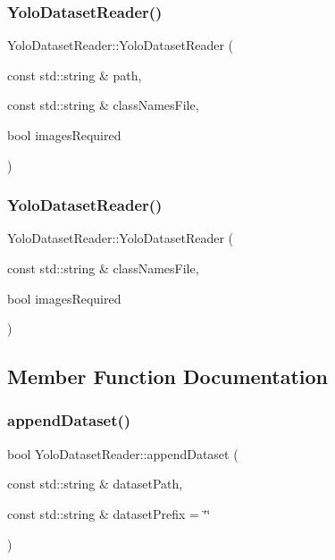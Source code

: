 \subsubsection{\texorpdfstring{Yolo\+Dataset\+Reader()}{YoloDatasetReader()}\hspace{0.1cm}{\footnotesize\ttfamily [1/2]}}
{\footnotesize\ttfamily Yolo\+Dataset\+Reader\+::\+Yolo\+Dataset\+Reader (\begin{DoxyParamCaption}\item[{const std\+::string \&}]{path,  }\item[{const std\+::string \&}]{class\+Names\+File,  }\item[{bool}]{images\+Required }\end{DoxyParamCaption})}

\mbox{\label{class_yolo_dataset_reader_a2419e2bae31ff7b7511a9d5400568a6d}} 
\subsubsection{\texorpdfstring{Yolo\+Dataset\+Reader()}{YoloDatasetReader()}\hspace{0.1cm}{\footnotesize\ttfamily [2/2]}}
{\footnotesize\ttfamily Yolo\+Dataset\+Reader\+::\+Yolo\+Dataset\+Reader (\begin{DoxyParamCaption}\item[{const std\+::string \&}]{class\+Names\+File,  }\item[{bool}]{images\+Required }\end{DoxyParamCaption})}



\subsection{Member Function Documentation}
\mbox{\label{class_yolo_dataset_reader_adabb18f657d4e0dc7b03f7f1b77eb452}} 
\subsubsection{\texorpdfstring{append\+Dataset()}{appendDataset()}}
{\footnotesize\ttfamily bool Yolo\+Dataset\+Reader\+::append\+Dataset (\begin{DoxyParamCaption}\item[{const std\+::string \&}]{dataset\+Path,  }\item[{const std\+::string \&}]{dataset\+Prefix = {\ttfamily \char`\"{}\char`\"{}} }\end{DoxyParamCaption})\hspace{0.3cm}{\ttfamily [virtual]}}



